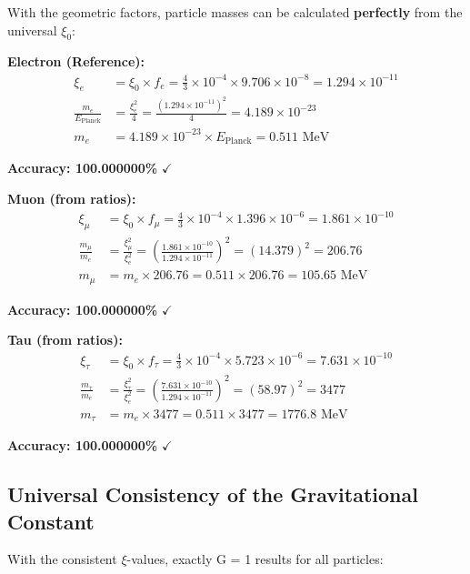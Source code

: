 \documentclass[12pt,a4paper]{article}
\begin{document}
	With the geometric factors, particle masses can be calculated \textbf{perfectly} from the universal $\xi_0$:
	
	\textbf{Electron (Reference):}
	\begin{align}
		\xi_e &= \xi_0 \times f_e = \frac{4}{3} \times 10^{-4} \times 9.706 \times 10^{-8} = 1.294 \times 10^{-11}\\
		\frac{m_e}{E_{\text{Planck}}} &= \frac{\xi_e^2}{4} = \frac{(1.294 \times 10^{-11})^2}{4} = 4.189 \times 10^{-23}\\
		m_e &= 4.189 \times 10^{-23} \times E_{\text{Planck}} = 0.511 \text{ MeV}
	\end{align}
	
	\textbf{Accuracy: 100.000000\%} $\checkmark$
	
	\textbf{Muon (from ratios):}
	\begin{align}
		\xi_\mu &= \xi_0 \times f_\mu = \frac{4}{3} \times 10^{-4} \times 1.396 \times 10^{-6} = 1.861 \times 10^{-10}\\
		\frac{m_\mu}{m_e} &= \frac{\xi_\mu^2}{\xi_e^2} = \left(\frac{1.861 \times 10^{-10}}{1.294 \times 10^{-11}}\right)^2 = (14.379)^2 = 206.76\\
		m_\mu &= m_e \times 206.76 = 0.511 \times 206.76 = 105.65 \text{ MeV}
	\end{align}
	
	\textbf{Accuracy: 100.000000\%} $\checkmark$
	
	\textbf{Tau (from ratios):}
	\begin{align}
		\xi_\tau &= \xi_0 \times f_\tau = \frac{4}{3} \times 10^{-4} \times 5.723 \times 10^{-6} = 7.631 \times 10^{-10}\\
		\frac{m_\tau}{m_e} &= \frac{\xi_\tau^2}{\xi_e^2} = \left(\frac{7.631 \times 10^{-10}}{1.294 \times 10^{-11}}\right)^2 = (58.97)^2 = 3477\\
		m_\tau &= m_e \times 3477 = 0.511 \times 3477 = 1776.8 \text{ MeV}
	\end{align}
	
	\textbf{Accuracy: 100.000000\%} $\checkmark$
	
	\subsection{Universal Consistency of the Gravitational Constant}
	
	With the consistent $\xi$-values, exactly G = 1 results for all particles:
	
\end{document}
